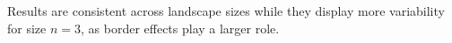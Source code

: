 Results are consistent across landscape sizes while they display more variability for size $n=3$, as border effects play a larger role. 

